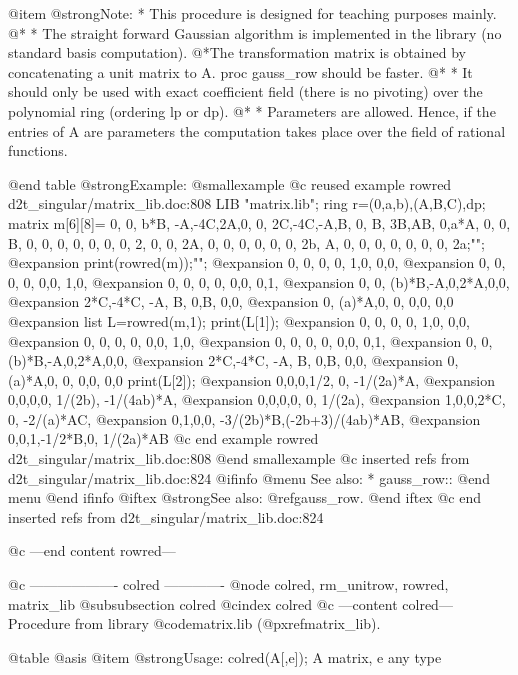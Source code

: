 @item @strong{Note:}
* This procedure is designed for teaching purposes mainly.
@* * The straight forward Gaussian algorithm is implemented in the
library (no standard basis computation).
@*The transformation matrix is obtained by concatenating a unit
matrix to A. proc gauss_row should be faster.
@* * It should only be used with exact coefficient field (there is no
pivoting) over the polynomial ring (ordering lp or dp).
@* * Parameters are allowed. Hence, if the entries of A are parameters
the computation takes place over the field of rational functions.

@end table
@strong{Example:}
@smallexample
@c reused example rowred d2t_singular/matrix_lib.doc:808 
LIB "matrix.lib";
ring r=(0,a,b),(A,B,C),dp;
matrix m[6][8]=
0, 0,  b*B, -A,-4C,2A,0, 0,
2C,-4C,-A,B, 0,  B, 3B,AB,
0,a*A,  0, 0, B,  0, 0, 0,
0, 0,  0, 0, 2,  0, 0, 2A,
0, 0,  0, 0, 0,  0, 2b, A,
0, 0,  0, 0, 0,  0, 0, 2a;"";
@expansion{} 
print(rowred(m));"";
@expansion{} 0,  0,    0,    0, 1,0,  0,0,
@expansion{} 0,  0,    0,    0, 0,0,  1,0,
@expansion{} 0,  0,    0,    0, 0,0,  0,1,
@expansion{} 0,  0,    (b)*B,-A,0,2*A,0,0,
@expansion{} 2*C,-4*C, -A,   B, 0,B,  0,0,
@expansion{} 0,  (a)*A,0,    0, 0,0,  0,0 
@expansion{} 
list L=rowred(m,1);
print(L[1]);
@expansion{} 0,  0,    0,    0, 1,0,  0,0,
@expansion{} 0,  0,    0,    0, 0,0,  1,0,
@expansion{} 0,  0,    0,    0, 0,0,  0,1,
@expansion{} 0,  0,    (b)*B,-A,0,2*A,0,0,
@expansion{} 2*C,-4*C, -A,   B, 0,B,  0,0,
@expansion{} 0,  (a)*A,0,    0, 0,0,  0,0 
print(L[2]);
@expansion{} 0,0,0,1/2,   0,        -1/(2a)*A,       
@expansion{} 0,0,0,0,     1/(2b),   -1/(4ab)*A,      
@expansion{} 0,0,0,0,     0,        1/(2a),          
@expansion{} 1,0,0,2*C,   0,        -2/(a)*AC,       
@expansion{} 0,1,0,0,     -3/(2b)*B,(-2b+3)/(4ab)*AB,
@expansion{} 0,0,1,-1/2*B,0,        1/(2a)*AB        
@c end example rowred d2t_singular/matrix_lib.doc:808
@end smallexample
@c inserted refs from d2t_singular/matrix_lib.doc:824
@ifinfo
@menu
See also:
* gauss_row::
@end menu
@end ifinfo
@iftex
@strong{See also:}
@ref{gauss_row}.
@end iftex
@c end inserted refs from d2t_singular/matrix_lib.doc:824

@c ---end content rowred---

@c ------------------- colred -------------
@node colred, rm_unitrow, rowred, matrix_lib
@subsubsection colred
@cindex colred
@c ---content colred---
Procedure from library @code{matrix.lib} (@pxref{matrix_lib}).

@table @asis
@item @strong{Usage:}
colred(A[,e]); A matrix, e any type

